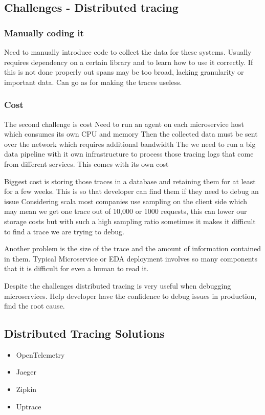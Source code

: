 \documentclass[a4paper, 11pt]{book}
\begin{document}
    \subsection{Challenges - Distributed tracing}

    \subsubsection{Manually coding it}
    Need to manually introduce code to collect the data for these systems.
    Usually requires dependency on a certain library and to learn how to use it correctly.
    If this is not done properly out spans may be too broad, lacking granularity or important data.
    Can go as for making the traces useless.

    \subsubsection{Cost}
    The second challenge is cost
    Need to run an agent on each microservice host which consumes its own CPU and memory
    Then the collected data must be sent over the network which requires additional bandwidth
    The we need to run a big data pipeline with it own infrastructure to process those tracing logs that come from different services.
    This comes with its own cost

    Biggest cost is storing those traces in a database and retaining them for at least for a few weeks.
    This is so that developer can find them if they need to debug an issue
    Considering scala most companies use sampling on the client side which may mean we get one trace out of 10,000 or 1000 requests,
    this can lower our storage costs but with such a high sampling ratio sometimes it makes it difficult to find a trace we are trying to debug.

    Another problem is the size of the trace and the amount of information contained in them.
    Typical Microservice or EDA deployment involves so many components that it is difficult for even a human to read it.

    Despite the challenges distributed tracing is very useful when debugging microservices.
    Help developer have the confidence to debug issues in production, find the root cause.


    \subsection{Distributed Tracing Solutions}
    \begin{itemize}
        \item OpenTelemetry
        \item Jaeger
        \item Zipkin
        \item Uptrace
    \end{itemize}
\end{document}
